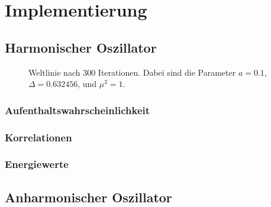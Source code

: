 
\chapter{Implementierung}

\section{Harmonischer Oszillator}


\begin{figure}[htbp]
    \centering
    \caption{%
        Weltlinie nach \num{300} Iterationen. Dabei sind die Parameter $a =
        \num{0.1}$, $\Delta = \num{0.632456}$, und $\mu^2 = \num{1}$.
    }
    \label{fig:}
\end{figure}

\subsection{Aufenthaltswahrscheinlichkeit}

\subsection{Korrelationen}

\subsection{Energiewerte}

\section{Anharmonischer Oszillator}


